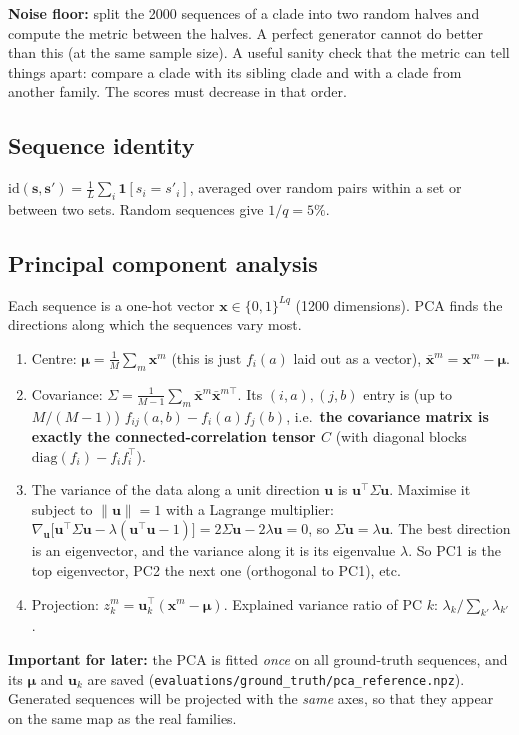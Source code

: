 \documentclass[11pt,a4paper]{article}
\newcommand{\s}{\bm{s}}
\newcommand{\one}{\mathbf{1}}
\begin{document}
\textbf{Noise floor:} split the 2000 sequences of a clade into two random halves and compute the metric
between the halves. A perfect generator cannot do better than this (at the same sample size). A useful
sanity check that the metric can tell things apart: compare a clade with its sibling clade and with
a clade from another family. The scores must decrease in that order.

\subsection{Sequence identity}
$\mathrm{id}(\s,\s')=\frac1L\sum_i\one[s_i=s'_i]$, averaged over random pairs within a set or between
two sets. Random sequences give $1/q=5\%$.

\subsection{Principal component analysis}\label{sec:pca}
Each sequence is a one-hot vector $\bm{x}\in\{0,1\}^{Lq}$ (1200 dimensions). PCA finds the directions
along which the sequences vary most.
\begin{enumerate}[nosep]
\item Centre: $\bm\mu=\frac1M\sum_m\bm{x}^m$ (this is just $f_i(a)$ laid out as a vector), $\bar{\bm x}^m=\bm x^m-\bm\mu$.
\item Covariance: $\Sigma=\frac1{M-1}\sum_m\bar{\bm x}^m\bar{\bm x}^{m\top}$. Its $(i,a),(j,b)$ entry is
      (up to $M/(M-1)$) $f_{ij}(a,b)-f_i(a)f_j(b)$, i.e.\ \textbf{the covariance matrix is exactly the
      connected-correlation tensor $C$} (with diagonal blocks $\mathrm{diag}(f_i)-f_if_i^\top$).
\item The variance of the data along a unit direction $\bm u$ is $\bm u^\top\Sigma\bm u$. Maximise it
      subject to $\|\bm u\|=1$ with a Lagrange multiplier:
      $\nabla_{\bm u}\big[\bm u^\top\Sigma\bm u-\lambda(\bm u^\top\bm u-1)\big]=2\Sigma\bm u-2\lambda\bm u=0$, so
      $\Sigma\bm u=\lambda\bm u$. The best direction is an eigenvector, and the variance along it is its
      eigenvalue $\lambda$. So PC1 is the top eigenvector, PC2 the next one (orthogonal to PC1), etc.
\item Projection: $z_k^m=\bm u_k^\top(\bm x^m-\bm\mu)$. Explained variance ratio of PC $k$:
      $\lambda_k/\sum_{k'}\lambda_{k'}$.
\end{enumerate}
\textbf{Important for later:} the PCA is fitted \emph{once} on all ground-truth sequences, and its
$\bm\mu$ and $\bm u_k$ are saved (\texttt{evaluations/ground\_truth/pca\_reference.npz}). Generated
sequences will be projected with the \emph{same} axes, so that they appear on the same map as the
real families.
\end{document}
